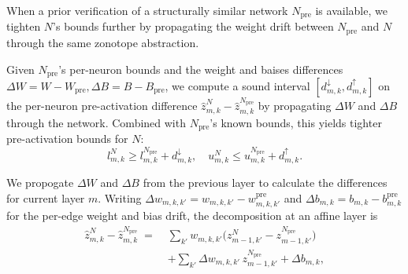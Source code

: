 \documentclass[11pt]{article}
\begin{document}
When a prior verification of a structurally similar network $N_\text{pre}$ is available, we tighten $N$'s bounds further by propagating the weight drift between $N_\text{pre}$ and $N$ through the same zonotope abstraction.

Given $N_\text{pre}$'s per-neuron bounds and the weight and baises differences
 $\Delta W = W - W_\text{pre}, \Delta B = B - B_\text{pre}$, 
we compute a sound interval $[d^\downarrow_{m,k}, d^\uparrow_{m,k}]$ on the per-neuron 
pre-activation difference $\hat z^{N}_{m,k} - \hat z^{N_\text{pre}}_{m,k}$ by 
propagating $\Delta W$ and $\Delta B$ through the network. Combined with $N_\text{pre}$'s known bounds, 
this yields tighter pre-activation bounds for $N$:
\begin{equation}
  l^{N}_{m,k} \ge l^{N_\text{pre}}_{m,k} + d^\downarrow_{m,k},
  \quad
  u^{N}_{m,k} \le u^{N_\text{pre}}_{m,k} + d^\uparrow_{m,k}.
  \label{eq:bt_combine}
\end{equation}

We propogate $\Delta W$ and $\Delta B$ from the previous layer to calculate the differences for current layer $m$. 
Writing $\Delta w_{m,k,k'} = w_{m,k,k'} - w^\text{pre}_{m,k,k'}$ and $\Delta b_{m,k} = b_{m,k} - b^\text{pre}_{m,k}$ 
for the per-edge weight and bias drift, the decomposition at an affine layer is
\begin{align}
  \hat z^{N}_{m,k} - \hat z^{N_\text{pre}}_{m,k}
  \;=\;& \sum_{k'} w_{m,k,k'} \bigl(z^{N}_{m-1,k'} - z^{N_\text{pre}}_{m-1,k'}\bigr) \nonumber\\
  &+ \sum_{k'} \Delta w_{m,k,k'}\, z^{N_\text{pre}}_{m-1,k'} + \Delta b_{m,k},
  \label{eq:bt_decomp}
\end{align}
\end{document}

